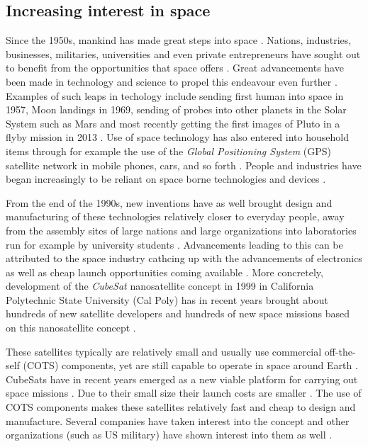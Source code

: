 \documentclass[english,12pt,a4paper,pdftex,elec,utf8]{aaltothesis}
\begin{document}
\subsection{Increasing interest in space}
Since the 1950s, mankind has made great steps into space \cite{aftersputnik}. Nations, industries, businesses, militaries, universities and even private entrepreneurs have sought out to benefit from the opportunities that space offers \cite{aftersputnik, rocketeers, accesstospace}. Great advancements have been made in technology and science to propel this endeavour even further \cite{aftersputnik}. Examples of such leaps in techology include sending first human into space in 1957, Moon landings in 1969, sending of probes into other planets in the Solar System such as Mars and most recently getting the first images of Pluto in a flyby mission in 2013 \cite{aftersputnik, pluto}. Use of space technology has also entered into household items through for example the use of the \textit{Global Positioning System} (GPS) satellite network in mobile phones, cars, and so forth \cite{satcommunications}. People and industries have began increasingly to be reliant on space borne technologies and devices \cite{satcommunications}.\par
From the end of the 1990s, new inventions have as well brought design and manufacturing of these technologies relatively closer to everyday people, away from the assembly sites of large nations and large organizations into laboratories run for example by university students \cite{bouwmeester}. Advancements leading to this can be attributed to the space industry cathcing up with the advancements of electronics as well as cheap launch opportunities coming available \cite{cubesatevolution, launchmarket}. More concretely, development of the \textit{CubeSat} nanosatellite concept in 1999 in California Polytechnic State University (Cal Poly) has in recent years brought about hundreds of new satellite developers and hundreds of new space missions based on this nanosatellite concept \cite{bouwmeester, cubesatevolution, cds}. \par 
These satellites typically are relatively small and usually use commercial off-the-self (COTS) components, yet are still capable to operate in space around Earth \cite{bouwmeester, cubesatevolution}. CubeSats have in recent years emerged as a new viable platform for carrying out space missions \cite{cubesatevolution}. Due to their small size their launch costs are smaller \cite{launchmarket}. The use of COTS components makes these satellites relatively fast and cheap to design and manufacture. Several companies have taken interest into the concept and other organizations (such as US military) have shown interest into them as well \cite{bouwmeester, cubesatevolution, launchmarket}.\par 
\end{document}
